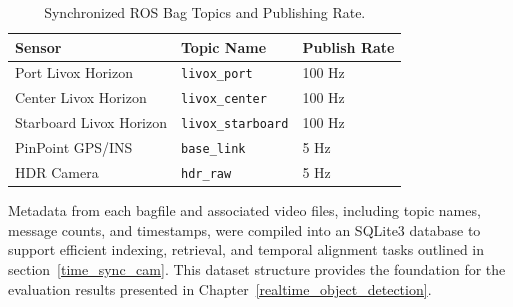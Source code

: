 \documentclass{erauthesis}
\begin{document}
\begin{table}[h]
\centering
\begin{tabular}{lll}
\hline
Sensor & Topic Name & Publish Rate \\ \hline
Port Livox Horizon & \texttt{livox\_port} & 100 Hz \\
Center Livox Horizon & \texttt{livox\_center} & 100 Hz \\
Starboard Livox Horizon & \texttt{livox\_starboard} & 100 Hz \\
PinPoint GPS/INS & \texttt{base\_link} & 5 Hz \\
HDR Camera & \texttt{hdr\_raw} & 5 Hz \\ %
\end{tabular}
\caption{Synchronized ROS Bag Topics and Publishing Rate.}
\label{tab:ros_topics}
\end{table}






Metadata from each bagfile and associated video files, including topic names, message counts, and timestamps, were compiled into an SQLite3 database to support efficient indexing, retrieval, and temporal alignment tasks outlined in section~\ref{time_sync_cam}.
This dataset structure provides the foundation for the evaluation results presented in Chapter~\ref{realtime_object_detection}.



\end{document}
